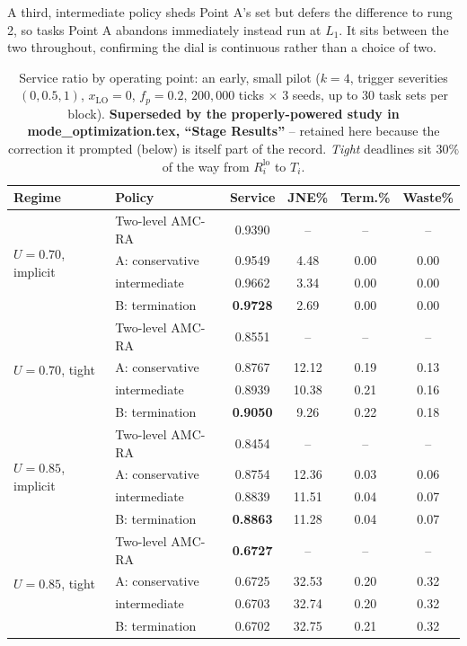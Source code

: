 \noindent A third, intermediate policy sheds Point A's set but defers the
difference to rung 2, so tasks Point A abandons immediately instead run at
$L_1$. It sits between the two throughout, confirming the dial is continuous
rather than a choice of two.

\begin{table}[h]
\centering
\caption{Service ratio by operating point: an early, small pilot
($k=4$, trigger severities $(0, 0.5, 1)$, $x_{\mathrm{LO}} = 0$,
$f_p = 0.2$, $200{,}000$ ticks $\times$ 3 seeds, up to 30 task sets per
block). \textbf{Superseded by the properly-powered study in
mode\_optimization.tex, ``Stage Results''} -- retained here because the
correction it prompted (below) is itself part of the record. \emph{Tight}
deadlines sit $30\%$ of the way from $R_i^{\mathrm{lo}}$ to $T_i$.}
\label{tab:operating-points}
\begin{tabular}{llcccc}
\toprule
Regime & Policy & Service & JNE\% & Term.\% & Waste\% \\
\midrule
\multirow{4}{*}{$U=0.70$, implicit}
 & Two-level AMC-RA   & 0.9390 & --    & --   & --   \\
 & A: conservative    & 0.9549 & 4.48  & 0.00 & 0.00 \\
 & \quad intermediate & 0.9662 & 3.34  & 0.00 & 0.00 \\
 & B: termination     & \textbf{0.9728} & 2.69 & 0.00 & 0.00 \\
\midrule
\multirow{4}{*}{$U=0.70$, tight}
 & Two-level AMC-RA   & 0.8551 & --    & --   & --   \\
 & A: conservative    & 0.8767 & 12.12 & 0.19 & 0.13 \\
 & \quad intermediate & 0.8939 & 10.38 & 0.21 & 0.16 \\
 & B: termination     & \textbf{0.9050} & 9.26 & 0.22 & 0.18 \\
\midrule
\multirow{4}{*}{$U=0.85$, implicit}
 & Two-level AMC-RA   & 0.8454 & --    & --   & --   \\
 & A: conservative    & 0.8754 & 12.36 & 0.03 & 0.06 \\
 & \quad intermediate & 0.8839 & 11.51 & 0.04 & 0.07 \\
 & B: termination     & \textbf{0.8863} & 11.28 & 0.04 & 0.07 \\
\midrule
\multirow{4}{*}{$U=0.85$, tight}
 & Two-level AMC-RA   & \textbf{0.6727} & -- & -- & -- \\
 & A: conservative    & 0.6725 & 32.53 & 0.20 & 0.32 \\
 & \quad intermediate & 0.6703 & 32.74 & 0.20 & 0.32 \\
 & B: termination     & 0.6702 & 32.75 & 0.21 & 0.32 \\
\bottomrule
\end{tabular}
\end{table}

